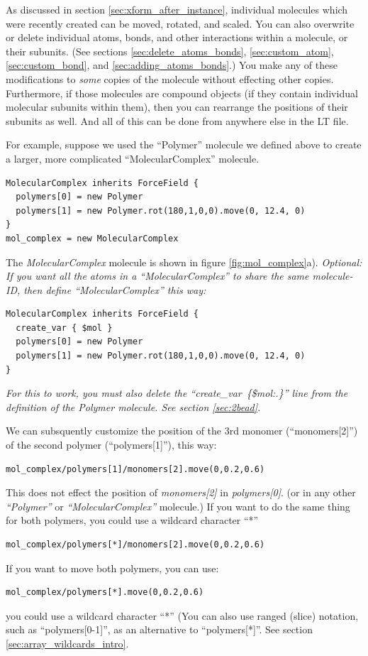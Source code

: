 \documentclass[11pt]{article}
\begin{document}
As discussed in section \ref{sec:xform_after_instance},
individual molecules which were recently created
can be moved, rotated, and scaled.
You can also overwrite or delete individual atoms, 
bonds, and other interactions within a molecule, or their subunits.
(See sections 
\ref{sec:delete_atoms_bonds}, 
\ref{sec:custom_atom},
\ref{sec:custom_bond},
and \ref{sec:adding_atoms_bonds}.)
You make any of these modifications to \textit{some} copies 
of the molecule without effecting other copies.
Furthermore, if those molecules are compound objects 
(if they contain individual molecular subunits within them),
then you can rearrange the positions of their subunits as well.
And all of this can be done from anywhere else in the LT file.

For example, suppose we used the ``Polymer'' molecule we defined above
to create a larger, more complicated ``MolecularComplex'' molecule.
\begin{verbatim}
MolecularComplex inherits ForceField {
  polymers[0] = new Polymer
  polymers[1] = new Polymer.rot(180,1,0,0).move(0, 12.4, 0)
}
mol_complex = new MolecularComplex
\end{verbatim}
The \textit{MolecularComplex} molecule is shown in figure \ref{fig:mol_complex}a). 
\textit{Optional: If you want all the atoms in a ``MolecularComplex'' to share the same molecule-ID,
then define ``MolecularComplex'' this way:}
\begin{verbatim}
MolecularComplex inherits ForceField {
  create_var { $mol }
  polymers[0] = new Polymer
  polymers[1] = new Polymer.rot(180,1,0,0).move(0, 12.4, 0)
}
\end{verbatim}
\textit{For this to work, you must also delete the 
 \mbox{\textit{``create\_var \{\$mol:.\}''}} line from
 the definition of the Polymer molecule. See section \ref{sec:2bead}.}


We can subsquently customize the position of the 3rd monomer (``monomers[2]'')
of the second polymer (``polymers[1]''), this way:
\begin{verbatim}
mol_complex/polymers[1]/monomers[2].move(0,0.2,0.6)
\end{verbatim}

This does not effect the position of
\textit{monomers[2]} in \textit{polymers[0]}.
(or in any other \textit{``Polymer''} or
\textit{``MolecularComplex''} molecule.)
If you want to do the same thing for both polymers,
you could use a wildcard character ``*''
\begin{verbatim}
mol_complex/polymers[*]/monomers[2].move(0,0.2,0.6)
\end{verbatim}
If you want to move both polymers, you can use:
\begin{verbatim}
mol_complex/polymers[*].move(0,0.2,0.6)
\end{verbatim}
you could use a wildcard character ``*''
(You can also use ranged (slice) notation, such as ``polymers[0-1]'',
 as an alternative to ``polymers[*]''. 
See section \ref{sec:array_wildcards_intro}.
\end{document}
